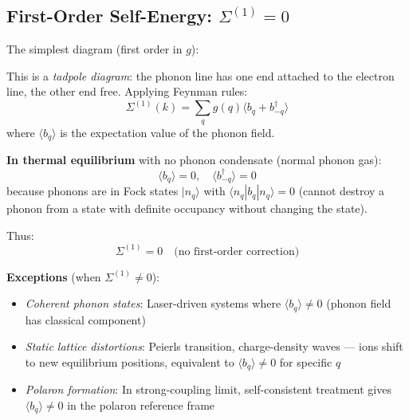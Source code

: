 \documentclass[12pt]{article}
\begin{document}
\subsection{First-Order Self-Energy: $\Sigma^{(1)} = 0$}

The simplest diagram (first order in $g$):

\begin{center}
\end{center}

This is a \textit{tadpole diagram}: the phonon line has one end attached to the electron line, the other end free. Applying Feynman rules:
\begin{equation}
\Sigma^{(1)}(k) = \sum_q g(q) \langle b_q + b^\dagger_{-q} \rangle
\end{equation}
where $\langle b_q \rangle$ is the expectation value of the phonon field.

\textbf{In thermal equilibrium} with no phonon condensate (normal phonon gas):
\begin{equation}
\langle b_q \rangle = 0, \quad \langle b^\dagger_{-q} \rangle = 0
\end{equation}
because phonons are in Fock states $|n_q\rangle$ with $\langle n_q|b_q|n_q\rangle = 0$ (cannot destroy a phonon from a state with definite occupancy without changing the state).

Thus:
\begin{equation}
\boxed{
\Sigma^{(1)} = 0 \quad \text{(no first-order correction)}
}
\end{equation}

\textbf{Exceptions} (when $\Sigma^{(1)} \neq 0$):
\begin{itemize}
\item \textit{Coherent phonon states}: Laser-driven systems where $\langle b_q \rangle \neq 0$ (phonon field has classical component)
\item \textit{Static lattice distortions}: Peierls transition, charge-density waves — ions shift to new equilibrium positions, equivalent to $\langle b_q \rangle \neq 0$ for specific $q$
\item \textit{Polaron formation}: In strong-coupling limit, self-consistent treatment gives $\langle b_q \rangle \neq 0$ in the polaron reference frame
\end{itemize}
\end{document}
